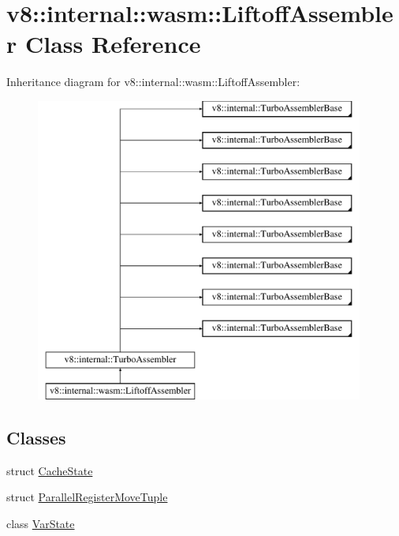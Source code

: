 \hypertarget{classv8_1_1internal_1_1wasm_1_1LiftoffAssembler}{}\section{v8\+:\+:internal\+:\+:wasm\+:\+:Liftoff\+Assembler Class Reference}
\label{classv8_1_1internal_1_1wasm_1_1LiftoffAssembler}
Inheritance diagram for v8\+:\+:internal\+:\+:wasm\+:\+:Liftoff\+Assembler\+:\begin{figure}[H]
\begin{center}
\leavevmode
\includegraphics[height=10.000000cm]{classv8_1_1internal_1_1wasm_1_1LiftoffAssembler}
\end{center}
\end{figure}
\subsection*{Classes}
\begin{DoxyCompactItemize}
\item 
struct \mbox{\hyperlink{structv8_1_1internal_1_1wasm_1_1LiftoffAssembler_1_1CacheState}{Cache\+State}}
\item 
struct \mbox{\hyperlink{structv8_1_1internal_1_1wasm_1_1LiftoffAssembler_1_1ParallelRegisterMoveTuple}{Parallel\+Register\+Move\+Tuple}}
\item 
class \mbox{\hyperlink{classv8_1_1internal_1_1wasm_1_1LiftoffAssembler_1_1VarState}{Var\+State}}
\end{DoxyCompactItemize}
